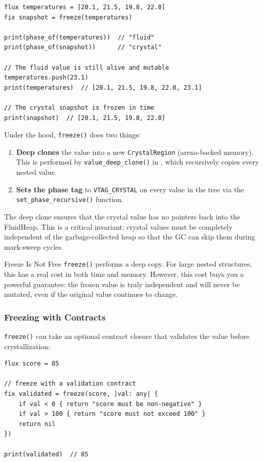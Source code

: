\begin{lstlisting}[language=Lattice, caption={The \texttt{freeze()} function}]
flux temperatures = [20.1, 21.5, 19.8, 22.0]
fix snapshot = freeze(temperatures)

print(phase_of(temperatures))  // "fluid"
print(phase_of(snapshot))      // "crystal"

// The fluid value is still alive and mutable
temperatures.push(23.1)
print(temperatures)  // [20.1, 21.5, 19.8, 22.0, 23.1]

// The crystal snapshot is frozen in time
print(snapshot)  // [20.1, 21.5, 19.8, 22.0]
\end{lstlisting}

Under the hood, \lstinline|freeze()| does two things:

\begin{enumerate}
  \item \textbf{Deep clones} the value into a new \lstinline|CrystalRegion| (arena-backed memory). This is performed by \lstinline|value_deep_clone()| in , which recursively copies every nested value.
  \item \textbf{Sets the phase tag} to \lstinline|VTAG_CRYSTAL| on every value in the tree via the \lstinline|set_phase_recursive()| function.
\end{enumerate}

The deep clone ensures that the crystal value has no pointers back into the FluidHeap.
This is a critical invariant: crystal values must be completely independent of the garbage-collected heap so that the GC can skip them during mark-sweep cycles.

\begin{notebox}{Freeze Is Not Free}
\lstinline|freeze()| performs a deep copy.
For large nested structures, this has a real cost in both time and memory.
However, this cost buys you a powerful guarantee: the frozen value is truly independent and will never be mutated, even if the original value continues to change.
\end{notebox}

\subsubsection{Freezing with Contracts}

\lstinline|freeze()| can take an optional contract closure that validates the value before crystallization:

\begin{lstlisting}[language=Lattice, caption={Freeze with contract validation}]
flux score = 85

// freeze with a validation contract
fix validated = freeze(score, |val: any| {
    if val < 0 { return "score must be non-negative" }
    if val > 100 { return "score must not exceed 100" }
    return nil
})

print(validated)  // 85
\end{lstlisting}

